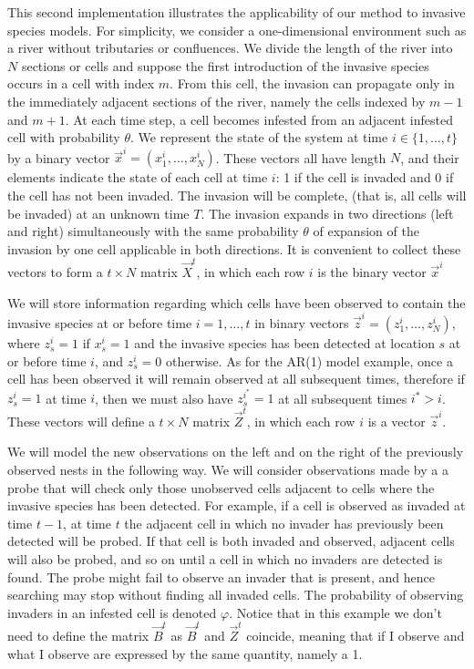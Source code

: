 This second implementation illustrates the applicability of our method to invasive species models. For simplicity, we consider a one-dimensional environment such as a river without tributaries or confluences. We divide the length of the river into $N$ sections or cells and suppose the first introduction of the invasive species occurs in a cell with index $m$. From this cell, the invasion can propagate only in the immediately adjacent sections of the river, namely the cells indexed by $m-1$ and $m+1$. At each time step, a cell becomes infested from an adjacent infested cell with probability $\theta$. We represent the state of the system at time $i \in \{ 1, \dots, t \}$ by a binary vector $\vec{x}^{i} = (x_1^{i}, \dots, x_{N}^{i})$. These vectors all have length $N$, and their elements indicate the state of each cell at time $i$: 1 if the cell is invaded and 0 if the cell has not been invaded. The invasion will be complete, (that is, all cells will be invaded) at an unknown time $T$. 
The invasion expands in two directions (left and right) simultaneously with the same probability $\theta$ of expansion of the invasion by one cell applicable in both directions. It is convenient to collect these vectors to form a $t\times N$ matrix $\vec{X}^{t}$, in which each row $i$ is the binary vector $\vec{x}^{i}$

We will store information regarding which cells have been observed to contain the invasive species at or before time $i = 1, \dots, t$ in binary vectors $\vec{z}^{i} = (z_1^{i}, \dots, z_{N}^{i})$, where $z_s^{i} = 1$ if $x_s^{i} = 1$ and the invasive species has been detected at location $s$ at or before time $i$, and $z_s^{i} = 0$ otherwise. As for the AR(1) model example, once a cell has been observed it will remain observed at all subsequent times, therefore if $z_s^{i} = 1$ at time $i$, then we must also have $z_s^{i^{*}} = 1$ at all subsequent times $i^{*} > i$. These vectors will define a $t \times N$ matrix $\vec{Z}^{t}$, in which each row $i$ is a vector $\vec{z}^{i}$.

We will model the new observations on the left and on the right of the previously observed nests in the following way. We will consider observations made by a a probe that will check only those unobserved cells adjacent to cells where the invasive species has been detected. For example, if a cell is observed as invaded at time $t-1$, at time $t$ the adjacent cell in which no invader has previously been detected will be probed. If that cell is both invaded and observed, adjacent cells will also be probed, and so on until a cell in which no invaders are detected is found. The probe might fail to observe an invader that is present, and hence searching may stop without finding all invaded cells. The probability of observing invaders in an infested cell is denoted $\varphi$. Notice that in this example we don't need to define the matrix $\vec{B}^t$ as $\vec{B}^t$ and $\vec{Z}^t$ coincide, meaning that if I observe and what I observe are expressed by the same quantity, namely a 1.

